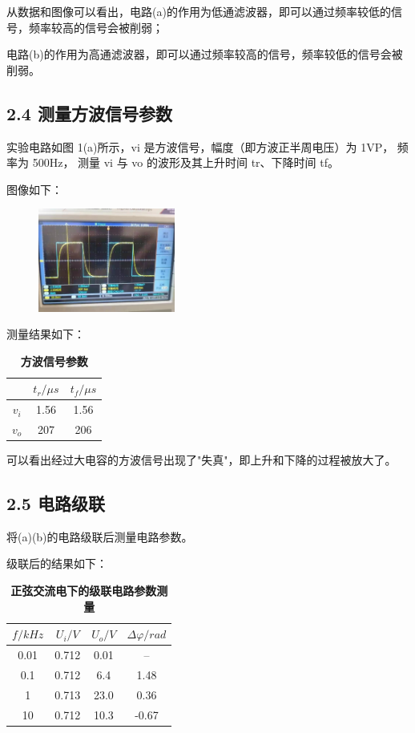 \documentclass[UTF8]{ctexart}
\begin{document}
从数据和图像可以看出，电路(a)的作用为低通滤波器，即可以通过频率较低的信号，频率较高的信号会被削弱；

电路(b)的作用为高通滤波器，即可以通过频率较高的信号，频率较低的信号会被削弱。

\subsection*{2.4 测量方波信号参数}

实验电路如图 1(a)所示，vi 是方波信号，幅度（即方波正半周电压）为 1VP，
频率为 500Hz， 测量 vi 与 vo 的波形及其上升时间 tr、下降时间 tf。

图像如下：
\begin{figure}[htbp]
    \centering
    \includegraphics[width=0.40\textwidth]{方波-输入输出.jpg}
\end{figure}

测量结果如下：
\begin{table}[H]
    \centering
    \caption{\label{表4}\textbf{方波信号参数}}
    \begin{tabular}{ccc}
    \toprule
            &$t_r/\mu s$ & $t_f/ \mu s$  \\
    \midrule
            $v_i$ & 1.56 & 1.56 \\
            $v_o$ & 207 & 206 \\
    \bottomrule
    \end{tabular}
\end{table}

可以看出经过大电容的方波信号出现了"失真"，即上升和下降的过程被放大了。

\subsection*{2.5 电路级联}
将(a)(b)的电路级联后测量电路参数。

级联后的结果如下：
\begin{table}[H]
    \centering
    \caption{\label{表5}\textbf{正弦交流电下的级联电路参数测量}}
    \begin{tabular}{cccc}
    \toprule
        $f/kHz$ & $U_i/V$ & $U_o/V$ &  $\Delta \varphi / rad$ \\
    \midrule
        0.01 & 0.712 & 0.01& --\\
        0.1  & 0.712 & 6.4 & 1.48\\
        1    & 0.713 & 23.0 & 0.36 \\
        10   & 0.712 & 10.3 & -0.67 \\

    \bottomrule
    \end{tabular}
\end{table}
\end{document}
